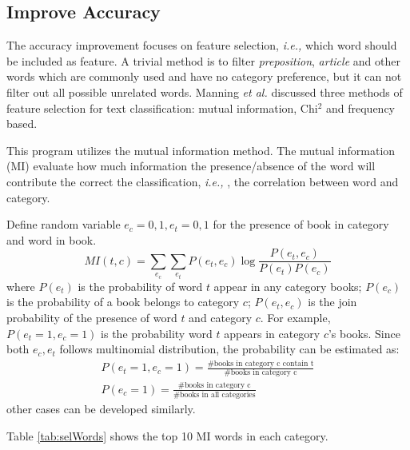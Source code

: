 \documentclass{article}
\newcommand{\ie}{{\em i.e., }}
\newcommand{\etal}{{\em et al. }}
\begin{document}
\subsection{Improve Accuracy}
The accuracy improvement focuses on feature selection, \ie which word should be included as feature.
A trivial method is to filter \textit{preposition}, \textit{article} and other words which are commonly used and have no category preference, but it can not filter out all possible unrelated words.
Manning \etal \cite{Manning2008IIR} discussed three methods of feature selection for text classification: 
mutual information, Chi$^2$ and frequency based.

This program utilizes the mutual information method.
The mutual information (MI) evaluate how much information the presence/absence of the word will contribute the correct the classification, \ie, the correlation between word and category.

Define random variable $e_c={0,1}, e_t={0,1}$ for the presence of book in category and word in book.
\begin{equation}
MI(t,c)=\sum\limits_{e_c}\sum\limits_{e_t} P(e_t, e_c) \log \frac{P(e_t, e_c)}{P(e_t)P(e_c)}
\end{equation}
where $P(e_t)$ is the probability of word $t$ appear in any category books; $P(e_c)$ is the probability of a book belongs to category $c$; $P(e_t, e_c)$ is the join probability of the presence of word $t$ and category $c$.
For example, $P(e_t=1, e_c=1)$ is the probability word $t$ appears in category $c$'s books.
Since both $e_c, e_t$ follows multinomial distribution, the probability can be estimated as:
\begin{align} 
P(e_t=1, e_c=1) = \frac{\#\mbox{books in category c contain t}}{\#\mbox{books in category c}} \nonumber \\
P(e_c=1) = \frac{\#\mbox{books in category c}}{\#\mbox{books in all categories}} \nonumber
\end{align}
other cases can be developed similarly.

Table \ref{tab:selWords} shows the top 10 MI words in each category.
\end{document}

